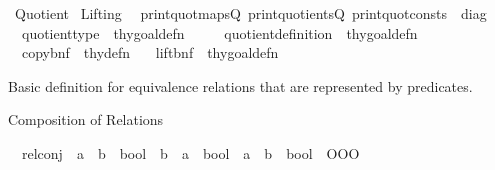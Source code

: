 %
\begin{isabellebody}%
%
%
\isadelimdocument
%
\endisadelimdocument
%
\isatagdocument
%
\isamarkuptrue%
%
\endisatagdocument
{\isafolddocument}%
%
\isadelimdocument
%
\endisadelimdocument
%
\isadelimtheory
%
\endisadelimtheory
%
\isatagtheory
{}\isamarkupfalse%
\ Quotient\isanewline
{}\ Lifting\isanewline
{}\isanewline
\ \ {\isachardoublequoteopen}print{\isacharunderscore}{\kern0pt}quotmapsQ{}{\isachardoublequoteclose}\ {\isachardoublequoteopen}print{\isacharunderscore}{\kern0pt}quotientsQ{}{\isachardoublequoteclose}\ {\isachardoublequoteopen}print{\isacharunderscore}{\kern0pt}quotconsts{\isachardoublequoteclose}\ {\isacharcolon}{\kern0pt}{\isacharcolon}{\kern0pt}\ diag\ \isanewline
\ \ {\isachardoublequoteopen}quotient{\isacharunderscore}{\kern0pt}type{\isachardoublequoteclose}\ {\isacharcolon}{\kern0pt}{\isacharcolon}{\kern0pt}\ thy{\isacharunderscore}{\kern0pt}goal{\isacharunderscore}{\kern0pt}defn\ \ {\isachardoublequoteopen}{\isacharslash}{\kern0pt}{\isachardoublequoteclose}\ \isanewline
\ \ {\isachardoublequoteopen}quotient{\isacharunderscore}{\kern0pt}definition{\isachardoublequoteclose}\ {\isacharcolon}{\kern0pt}{\isacharcolon}{\kern0pt}\ thy{\isacharunderscore}{\kern0pt}goal{\isacharunderscore}{\kern0pt}defn\ \isanewline
\ \ {\isachardoublequoteopen}copy{\isacharunderscore}{\kern0pt}bnf{\isachardoublequoteclose}\ {\isacharcolon}{\kern0pt}{\isacharcolon}{\kern0pt}\ thy{\isacharunderscore}{\kern0pt}defn\ \isanewline
\ \ {\isachardoublequoteopen}lift{\isacharunderscore}{\kern0pt}bnf{\isachardoublequoteclose}\ {\isacharcolon}{\kern0pt}{\isacharcolon}{\kern0pt}\ thy{\isacharunderscore}{\kern0pt}goal{\isacharunderscore}{\kern0pt}defn\isanewline
{}%
\endisatagtheory
{\isafoldtheory}%
%
\isadelimtheory
%
\endisadelimtheory
%
\begin{isamarkuptext}%
Basic definition for equivalence relations
  that are represented by predicates.%
\end{isamarkuptext}\isamarkuptrue%
%
\begin{isamarkuptext}%
Composition of Relations%
\end{isamarkuptext}\isamarkuptrue%
\isamarkupfalse%
\isanewline
\ \ rel{\isacharunderscore}{\kern0pt}conj\ {\isacharcolon}{\kern0pt}{\isacharcolon}{\kern0pt}\ {\isachardoublequoteopen}{\isacharparenleft}{\kern0pt}{\isacharprime}{\kern0pt}a\ {\isasymRightarrow}\ {\isacharprime}{\kern0pt}b\ {\isasymRightarrow}\ bool{\isacharparenright}{\kern0pt}\ {\isasymRightarrow}\ {\isacharparenleft}{\kern0pt}{\isacharprime}{\kern0pt}b\ {\isasymRightarrow}\ {\isacharprime}{\kern0pt}a\ {\isasymRightarrow}\ bool{\isacharparenright}{\kern0pt}\ {\isasymRightarrow}\ {\isacharprime}{\kern0pt}a\ {\isasymRightarrow}\ {\isacharprime}{\kern0pt}b\ {\isasymRightarrow}\ bool{\isachardoublequoteclose}\ {\isacharparenleft}{\kern0pt}\ {\isachardoublequoteopen}OOO{\isachardoublequoteclose}\ {}{}{\isacharparenright}{\kern0pt}\isanewline

\end{isabellebody}
